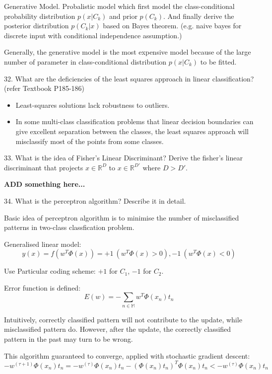 \documentclass[11pt,a4paper]{article}
\newcommand{\BOLD}[1]{\textbf{#1}}
\begin{document}
    Generative Model. Probalistic model which first model the class-conditional probability distribution $p(x|C_k)$ and prior $p(C_k)$. And finally derive the posterior distribution $p(C_k|x)$ based on Bayes theorem. (e.g. naive bayes for discrete input with conditional independence assumption.)
    
    Generally, the generative model is the most expensive model because of the large number of parameter in class-conditional distribution $p(x| C_k)$ to be fitted. 

    32. What are the deficiencies of the least squares approach in linear classification? (refer Textbook P185-186)
    
    \begin{itemize}
    \item Least-squares solutions lack robustness to outliers.

    \item In some multi-class classification problems that linear decision boundaries can give excellent separation between the classes, the least squares approach will misclassify most of the points from some classes.
    \end{itemize}
    
33. What is the idea of Fisher's Linear Discriminant? Derive the fisher's linear discriminant that projects $x \in \mathbb{R}^D$ to $x \in \mathbb{R}^{D'}$ where $D > D'$.

    \BOLD{ADD something here...}

34. What is the perceptron algorithm? Describe it in detail.

    Basic idea of perceptron algorithm is to minimise the number of misclassified patterns in two-class classfication problem.

    Generalised linear model:
    $$ y(x) = f( w^T \Phi(x) ) = + 1 \ (w^T \Phi(x) > 0), -1 \ (w^T \Phi(x) < 0) $$

    Use Particular coding scheme: $+1$ for $C_1$, $-1$ for $C_2$.

    Error function is defined: 
    $$ E(w) = - \sum_{n\in \mathbb{M}} w^T \Phi(x_n) t_n $$

    Intuitively, correctly classified pattern will not contribute to the update, while misclassified pattern do. However, after the update, the correctly classified pattern in the past may turn to be wrong. 

    This algorithm guaranteed to converge, applied with stochastic gradient descent:
    $$ - w^{(\tau + 1)} \Phi(x_n) t_n = - w^{(\tau)} \Phi(x_n) t_n - (\Phi(x_n) t_n)^T \Phi(x_n) t_n < - w^{(\tau)} \Phi(x_n) t_n $$
\end{document}
